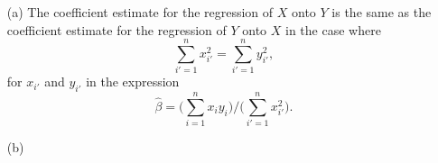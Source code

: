 
\begin{itemize}
    \item[(a)] The coefficient estimate for the regression of $X$ onto $Y$ is the same
        as the coefficient estimate for the regression of $Y$ onto $X$ in the case where 
        \[
            \sum_{i' = 1}^n x_{i'}^2 = \sum_{i' = 1}^n y_{i'}^2,
        \]
        for $x_{i'}$ and $y_{i'}$ in the expression
        \[
            \hat{\beta} = \Biggl(\sum_{i = 1}^n x_i y_i \Biggr) / 
            \Biggl(\sum_{i' = 1}^n x_{i'}^2 \Biggr).
        \]
    \item[(b)] 
\end{itemize}

